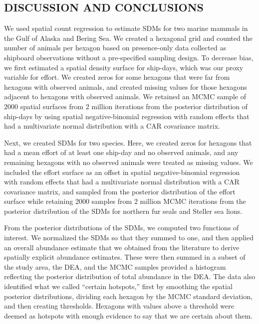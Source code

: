 \documentclass[11pt, titlepage]{article}
\begin{document}
\begin{spacing}{1.9}
\begin{flushleft}
\section{DISCUSSION AND CONCLUSIONS}

We used spatial count regression to estimate SDMs for two marine mammals in the Gulf of Alaska and Bering Sea.  We created a hexagonal grid and counted the number of animals per hexagon based on presence-only data collected as shipboard observations without a pre-specified sampling design. To decrease bias, we first estimated a spatial density surface for ship-days, which was our proxy variable for effort.  We created zeros for some hexagons that were far from hexagons with observed animals, and created missing values for those hexagons adjacent to hexagons with observed animals.  We retained an MCMC sample of 2000 spatial surfaces from 2 million iterations from the posterior distribution of ship-days by using spatial negative-binomial regression with random effects that had a multivariate normal distribution with a CAR covariance matrix.

Next, we created SDMs for two species. Here, we created zeros for hexagons that had a mean effort of at least one ship-day and no observed animals, and any remaining hexagons with no observed animals were treated as missing values.  We included the effort surface as an offset in spatial negative-binomial regression with random effects that had a multivariate normal distribution with a CAR covariance matrix, and sampled from the posterior distribution of the effort surface while retaining 2000 samples from 2 million MCMC iterations from the posterior distribution of the SDMs for northern fur seals and Steller sea lions.

From the posterior distributions of the SDMs, we computed two functions of interest.  We normalized the SDMs so that they summed to one, and then applied an overall abundance estimate that we obtained from the literature to derive spatially explicit abundance estimates.  These were then summed in a subset of the study area, the DEA, and the MCMC samples provided a histogram reflecting the posterior distribution of total abundance in the DEA.  The data also identified what we called ``certain hotspots,'' first by smoothing the spatial posterior distributions, dividing each hexagon by the MCMC standard deviation, and then creating thresholds.  Hexagons with values above a threshold were deemed as hotspots with enough evidence to say that we are certain about them.


\end{flushleft}
\end{spacing}
\end{document}

